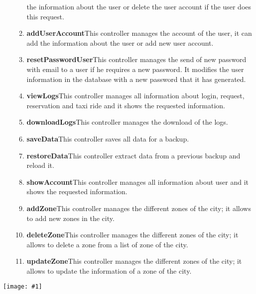 \documentclass[11pt, a4paper,titlepage]{article}
\newcommand{\image}[1]{
	\begin{center}
		\noindent \texttt{[image: \#1]}
	\end{center}
	}
\begin{document}
\begin{enumerate}
\begin{enumerate}
		the information about the user or delete the user account if the user does this request.
		\item \textbf{addUserAccount}This controller manages the account of the user, it can add 
		the information about the user or add new user account.
		\item \textbf{resetPasswordUser}This controller manages the send of new password with email 
		to a user if he requires a new password. It modifies the user information in the 
		database with a new password that it has generated.
		\item \textbf{viewLogs}This controller manages all information about login, request, 
		reservation and taxi ride and it shows the requested information.
		\item \textbf{downloadLogs}This controller manages the download of the logs.
		\item \textbf{saveData}This controller saves all data for a backup.
		\item \textbf{restoreData}This controller extract data from a previous backup and reload it.
		\item \textbf{showAccount}This controller manages all information about user and it shows the 
		 requested information.
		\item \textbf{addZone}This controller manages the different zones of the city; it allows to add 
		new zones in the city.
		\item \textbf{deleteZone}This controller manages the different zones of the city; it allows to 
		delete a zone from a list of zone of the city.
		\item \textbf{updateZone}This controller manages the different zones of the city; it allows to 
		update  the information of a zone of the city.
	\end{enumerate}
\end{enumerate}
\image{BCESystemAdministrator.png}
\newpage
\end{document}
